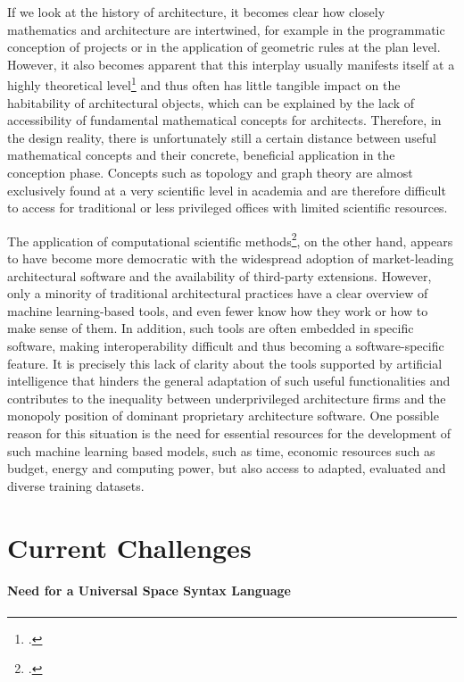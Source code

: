 \documentclass[a4paper, 12pt]{report}
\begin{document}
If we look at the history of architecture, it becomes clear how closely mathematics and architecture are intertwined, for example in the programmatic conception of projects or in the application of geometric rules at the plan level. However, it also becomes apparent that this interplay usually manifests itself at a highly theoretical level\footcite{baglivo1983incidence} and thus often has little tangible impact on the habitability of architectural objects, which can be explained by the lack of accessibility of fundamental mathematical concepts for architects. Therefore, in the design reality, there is unfortunately still a certain distance between useful mathematical concepts and their concrete, beneficial application in the conception phase. Concepts such as topology and graph theory are almost exclusively found at a very scientific level in academia and are therefore difficult to access for traditional or less privileged offices with limited scientific resources.

The application of computational scientific methods\footcite{caetano2020computational}, on the other hand, appears to have become more democratic with the widespread adoption of market-leading architectural software and the availability of third-party extensions. However, only a minority of traditional architectural practices have a clear overview of machine learning-based tools, and even fewer know how they work or how to make sense of them. In addition, such tools are often embedded in specific software, making interoperability difficult and thus becoming a software-specific feature. It is precisely this lack of clarity about the tools supported by artificial intelligence that hinders the general adaptation of such useful functionalities and contributes to the inequality between underprivileged architecture firms and the monopoly position of dominant proprietary architecture software. One possible reason for this situation is the need for essential resources for the development of such machine learning based models, such as time, economic resources such as budget, energy and computing power, but also access to adapted, evaluated and diverse training datasets.

\section{Current Challenges}\label{sec:current-challenges}

\paragraph{Need for a Universal Space Syntax Language}
\end{document}
